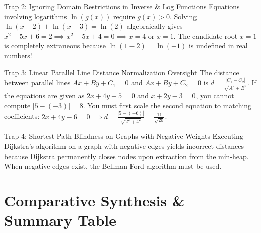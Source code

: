 \begin{trapbox}{Trap 2: Ignoring Domain Restrictions in Inverse \& Log Functions}
Equations involving logarithms $\ln(g(x))$ require $g(x) > 0$. Solving $\ln(x - 2) + \ln(x - 3) = \ln(2)$ algebraically gives $x^2 - 5x + 6 = 2 \implies x^2 - 5x + 4 = 0 \implies x = 4 \text{ or } x = 1$. The candidate root $x = 1$ is completely extraneous because $\ln(1 - 2) = \ln(-1)$ is undefined in real numbers!
\end{trapbox}

\begin{trapbox}{Trap 3: Linear Parallel Line Distance Normalization Oversight}
The distance between parallel lines $Ax + By + C_1 = 0$ and $Ax + By + C_2 = 0$ is $d = \frac{|C_1 - C_2|}{\sqrt{A^2 + B^2}}$. If the equations are given as $2x + 4y + 5 = 0$ and $x + 2y - 3 = 0$, you cannot compute $|5 - (-3)| = 8$. You must first scale the second equation to matching coefficients: $2x + 4y - 6 = 0 \implies d = \frac{|5 - (-6)|}{\sqrt{2^2 + 4^2}} = \frac{11}{\sqrt{20}}$.
\end{trapbox}

\begin{trapbox}{Trap 4: Shortest Path Blindness on Graphs with Negative Weights}
Executing Dijkstra's algorithm on a graph with negative edges yields incorrect distances because Dijkstra permanently closes nodes upon extraction from the min-heap. When negative edges exist, the Bellman-Ford algorithm must be used.
\end{trapbox}

\section{Comparative Synthesis \& Summary Table}

